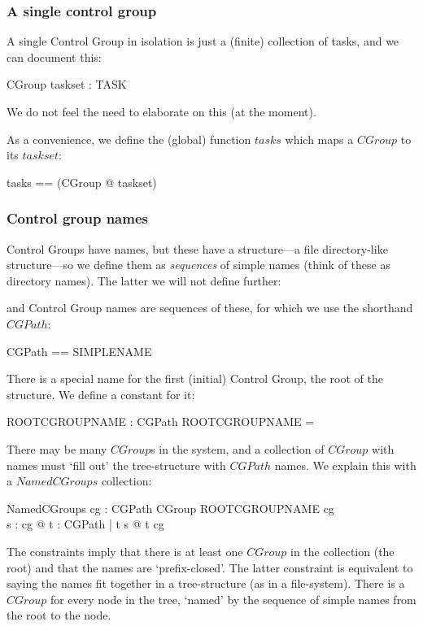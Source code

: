 \documentclass[a4paper,twoside,12pt]{article}
\begin{document}
\subsubsection*{A single control group}

A single Control Group in isolation is just a (finite) collection of tasks, and we can document this:

\begin{schema}{CGroup}
taskset : \finset TASK
\end{schema}
We do not feel the need to elaborate on this (at the moment).

As a convenience, we define the (global) function $tasks$ which maps a $CGroup$ to its $taskset$:
\begin{zed}
tasks == (\lambda CGroup @ taskset)
\end{zed}

\subsubsection*{Control group names}

Control Groups have names, but these have a structure---a file directory-like structure---so we define them as \emph{sequences} of simple names (think of these as directory names). The latter we will not define further:

\begin{zed}
[SIMPLENAME]
\end{zed}
and Control Group names are sequences of these, for which we use the shorthand $CGPath$:

\begin{zed}
CGPath == \seq SIMPLENAME
\end{zed}

There is a special name for the first (initial) Control Group, the root of the structure. We define a constant for it:

\begin{axdef}{}
ROOTCGROUPNAME : CGPath
\where
ROOTCGROUPNAME = \langle \rangle
\end{axdef}

There may be many $CGroup$s in the system, and a collection of $CGroup$ with names must `fill out' the tree-structure with $CGPath$ names. We explain this with a $NamedCGroups$ collection:

\begin{schema}{NamedCGroups}
cg : CGPath \ffun CGroup
\where
ROOTCGROUPNAME \in \dom cg \\
\forall s : \dom cg @ \forall t : CGPath | t \subset s @ t \in \dom cg
\end{schema}
The constraints imply that there is  at least one $CGroup$ in the collection (the root) and that the names are `prefix-closed'. The latter constraint is equivalent to saying the names fit together in a tree-structure (as in a file-system). 
There is a $CGroup$ for every node in the tree, `named' by the sequence of simple names from the root to the node.
\end{document}
